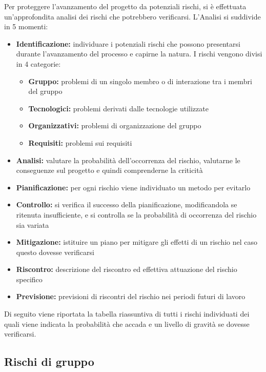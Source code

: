 \documentclass[12pt,a4paper]{article}
\begin{document}
Per proteggere l’avanzamento del progetto da potenziali rischi, si è effettuata un’approfondita analisi dei rischi che potrebbero verificarsi. L’Analisi si suddivide in 5 momenti:
\begin{itemize}
	\item \textbf{Identificazione:} individuare i potenziali rischi che possono presentarsi durante l’avanzamento del processo e capirne la natura. I rischi vengono divisi in 4 categorie:
	\begin{itemize}
		\item \textbf{Gruppo:} problemi di un singolo membro o di interazione tra i membri del gruppo
		\item \textbf{Tecnologici:} problemi derivati dalle tecnologie utilizzate
		\item \textbf{Organizzativi:} problemi di organizzazione del gruppo
		\item \textbf{Requisiti:} problemi sui requisiti
	\end{itemize}
	\item \textbf{Analisi:} valutare la probabilità dell’occorrenza del rischio, valutarne le conseguenze sul progetto e quindi comprenderne la criticità
	\item \textbf{Pianificazione:} per ogni rischio viene individuato un metodo per evitarlo
	\item \textbf{Controllo:} si verifica il successo della pianificazione, modificandola se ritenuta insufficiente, e si controlla se la probabilità di occorrenza del rischio sia variata
	\item \textbf{Mitigazione:} istituire un piano per mitigare gli effetti di un rischio nel caso questo dovesse verificarsi
	\item \textbf{Riscontro:} descrizione del riscontro ed effettiva attuazione del rischio specifico
	\item \textbf{Previsione:} previsioni di riscontri del rischio nei periodi futuri di lavoro
\end{itemize}
Di seguito viene riportata la tabella riassuntiva di tutti i rischi individuati dei quali viene indicata la probabilità che accada e un livello di gravità se dovesse verificarsi.

\subsection{Rischi di gruppo}
\end{document}
